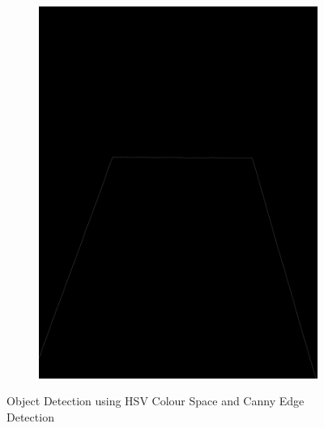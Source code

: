 \documentclass[a4paper,12pt]{article}
\begin{document}
\begin{appendices}
\begin{figure}[H]
\begin{subfigure}{.5\textwidth}
		\includegraphics[width=.98\textwidth]{3-1}
	\end{subfigure}
	\caption{\label{redlight} Object Detection using HSV Colour Space and Canny Edge Detection   }
\end{figure}
\begin{figure}[H]
	\centering
	\begin{subfigure}{.5\textwidth}
		\centering

\end{subfigure}
\end{figure}
\end{appendices}
\end{document}
